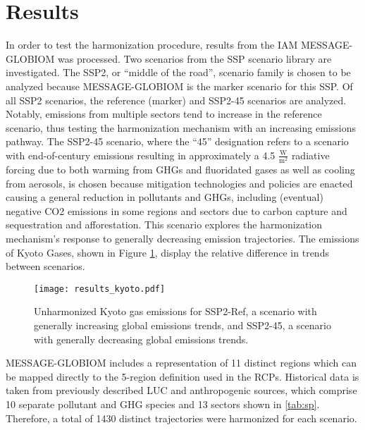 \section{Results}\label{sec:results}

In order to test the  harmonization procedure, results from the IAM
MESSAGE-GLOBIOM \cite{fricko_marker_2017} was processed. Two scenarios from the
SSP scenario library \cite{Riahi2017153,Rao2017346} are investigated. The SSP2,
or ``middle of the road'', scenario family is chosen to be analyzed because
MESSAGE-GLOBIOM is the marker scenario for this SSP. Of all SSP2 scenarios, the
reference (marker) and SSP2-45 scenarios are analyzed. Notably, emissions from
multiple sectors tend to increase in the reference scenario, thus testing the
harmonization mechanism with an increasing emissions pathway. The SSP2-45
scenario, where the ``45'' designation refers to a scenario with end-of-century
emissions resulting in approximately a 4.5 $\frac{\text{W}}{\text{m}^2}$
radiative forcing due to both warming from GHGs and fluoridated gases as well as
cooling from aerosols, is chosen because mitigation technologies and policies
are enacted causing a general reduction in pollutants and GHGs, including
(eventual) negative CO2 emissions in some regions and sectors due to carbon
capture and sequestration and afforestation. This scenario explores the
harmonization mechanism's response to generally decreasing emission
trajectories. The emissions of Kyoto Gases, shown in Figure \ref{fig:kyoto},
display the relative difference in trends between scenarios.


\begin{figure}
  \begin{center}
    \texttt{[image: results\_kyoto.pdf]}
    \caption[]{
      \label{fig:kyoto}
      Unharmonized Kyoto gas emissions for SSP2-Ref, a scenario with generally
      increasing global emissions trends, and SSP2-45, a scenario with generally
      decreasing global emissions trends.  }
  \end{center}
\end{figure}


MESSAGE-GLOBIOM includes a representation of 11 distinct regions which can be
mapped directly to the 5-region definition used in the RCPs. Historical data is
taken from previously described LUC and anthropogenic sources, which comprise 10
separate pollutant and GHG species and 13 sectors shown in
\ref{tab:sp}. Therefore, a total of 1430 distinct trajectories were harmonized
for each scenario.


